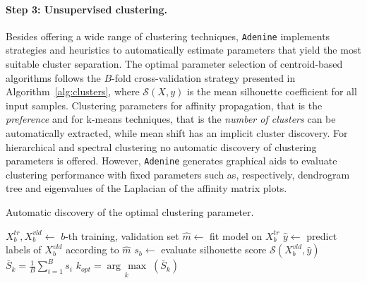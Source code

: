 \documentclass[twoside,11pt]{article}
\makeatletter
\newcommand{\argmax}[1]{\underset{#1}{\operatorname{arg}\,\operatorname{max}}\;}
\newcommand{\ade}{\texttt{Adenine}\@\xspace}
\makeatother
\begin{document}
\paragraph{Step 3: Unsupervised clustering.}
  Besides offering a wide range of clustering techniques,
  \ade implements strategies and heuristics to automatically estimate parameters that yield the most suitable cluster separation. 
  The optimal parameter selection of centroid-based algorithms follows the $B$-fold cross-validation strategy presented in Algorithm~\ref{alg:clusters}, where $\mathcal{S}(X,y)$ is the mean silhouette coefficient \citep{rousseeuw1987silhouettes} for all input samples.
  Clustering parameters for affinity propagation, that is the \emph{preference} \citep{frey2007clustering} and for k-means techniques, that is the \emph{number of clusters} \citep{bishop2006pattern} can be automatically extracted, while mean shift \citep{comaniciu2002mean} has an implicit cluster discovery.
  For hierarchical \citep{friedman2001elements} and spectral clustering \citep{shi2000normalized} no automatic discovery of clustering parameters is offered. However, \ade generates graphical aids to evaluate clustering performance with fixed parameters such as, respectively, dendrogram tree and eigenvalues of the Laplacian of the affinity matrix plots.
 
\begin{algorithm}
\caption{Automatic discovery of the optimal clustering parameter.}\label{alg:clusters}
\label{alg:clusters}
\begin{algorithmic}[1]
                \State $X^{tr}_b,X^{vld}_b\leftarrow$ $b$-th training, validation set
                \State $\hat{m}\leftarrow$ fit model on $X^{tr}_b$
                \State $\hat{y}\leftarrow$ predict labels of $X^{vld}_b$ according to $\hat{m}$
                \State $s_b\leftarrow$ evaluate silhouette score  $\mathcal{S}(X^{vld}_b,\hat{y})$
	\EndFor    
	\State $\bar{S}_k = \frac{1}{B}\sum_{i=1}^B s_i$
\EndFor
\State $k_{opt} = \argmax{k}(\bar{S}_k)$
\end{algorithmic}
\end{algorithm}
\end{document}
